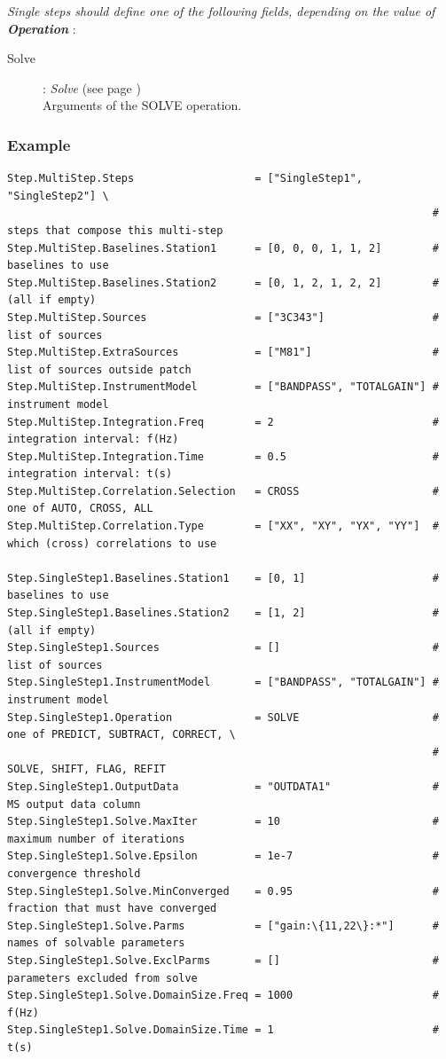 \documentclass[10pt]{lofar}
\begin{document}
\emph{Single steps should define one of the following fields, depending on the
value of \textbf{Operation}} :
\begin{description}
\item [Solve] : \emph{Solve} (see page \pageref{app-solve}) \\
    Arguments of the SOLVE operation.
\end{description}

\subsubsection*{Example}
{\footnotesize
\begin{verbatim}
Step.MultiStep.Steps                   = ["SingleStep1", "SingleStep2"] \
                                                                   # steps that compose this multi-step
Step.MultiStep.Baselines.Station1      = [0, 0, 0, 1, 1, 2]        # baselines to use
Step.MultiStep.Baselines.Station2      = [0, 1, 2, 1, 2, 2]        # (all if empty)
Step.MultiStep.Sources                 = ["3C343"]                 # list of sources
Step.MultiStep.ExtraSources            = ["M81"]                   # list of sources outside patch
Step.MultiStep.InstrumentModel         = ["BANDPASS", "TOTALGAIN"] # instrument model
Step.MultiStep.Integration.Freq        = 2                         # integration interval: f(Hz)
Step.MultiStep.Integration.Time        = 0.5                       # integration interval: t(s)
Step.MultiStep.Correlation.Selection   = CROSS                     # one of AUTO, CROSS, ALL
Step.MultiStep.Correlation.Type        = ["XX", "XY", "YX", "YY"]  # which (cross) correlations to use

Step.SingleStep1.Baselines.Station1    = [0, 1]                    # baselines to use
Step.SingleStep1.Baselines.Station2    = [1, 2]                    # (all if empty)
Step.SingleStep1.Sources               = []                        # list of sources
Step.SingleStep1.InstrumentModel       = ["BANDPASS", "TOTALGAIN"] # instrument model
Step.SingleStep1.Operation             = SOLVE                     # one of PREDICT, SUBTRACT, CORRECT, \
                                                                   # SOLVE, SHIFT, FLAG, REFIT
Step.SingleStep1.OutputData            = "OUTDATA1"                # MS output data column
Step.SingleStep1.Solve.MaxIter         = 10                        # maximum number of iterations
Step.SingleStep1.Solve.Epsilon         = 1e-7                      # convergence threshold
Step.SingleStep1.Solve.MinConverged    = 0.95                      # fraction that must have converged
Step.SingleStep1.Solve.Parms           = ["gain:\{11,22\}:*"]      # names of solvable parameters
Step.SingleStep1.Solve.ExclParms       = []                        # parameters excluded from solve
Step.SingleStep1.Solve.DomainSize.Freq = 1000                      # f(Hz)
Step.SingleStep1.Solve.DomainSize.Time = 1                         # t(s)


\end{verbatim}}
\end{document}
